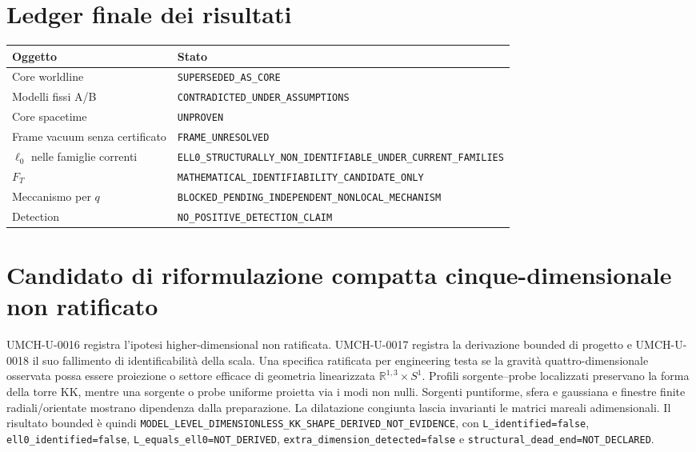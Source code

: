 \documentclass[11pt,a4paper]{article}
\begin{document}
\section{Ledger finale dei risultati}\label{sec:u-results}
\begin{center}\begin{tabular}{p{.48\linewidth}p{.43\linewidth}}\toprule
Oggetto&Stato\\\midrule
Core worldline&\verb|SUPERSEDED_AS_CORE|\\
Modelli fissi A/B&\verb|CONTRADICTED_UNDER_ASSUMPTIONS|\\
Core spacetime&\verb|UNPROVEN|\\
Frame vacuum senza certificato&\verb|FRAME_UNRESOLVED|\\
$\ell_0$ nelle famiglie correnti&\verb|ELL0_STRUCTURALLY_NON_IDENTIFIABLE_UNDER_CURRENT_FAMILIES|\\
$F_T$&\verb|MATHEMATICAL_IDENTIFIABILITY_CANDIDATE_ONLY|\\
Meccanismo per $q$&\verb|BLOCKED_PENDING_INDEPENDENT_NONLOCAL_MECHANISM|\\
Detection&\verb|NO_POSITIVE_DETECTION_CLAIM|\\\bottomrule\end{tabular}\end{center}

\section{Candidato di riformulazione compatta cinque-dimensionale non ratificato}\label{sec:u-kk-candidate}
UMCH-U-0016 registra l'ipotesi higher-dimensional non ratificata. UMCH-U-0017 registra la derivazione bounded di progetto e UMCH-U-0018 il suo fallimento di identificabilità della scala. Una specifica ratificata per engineering testa se la gravità quattro-dimensionale osservata possa essere proiezione o settore efficace di geometria linearizzata $\mathbb{R}^{1,3}\times S^1$. Profili sorgente--probe localizzati preservano la forma della torre KK, mentre una sorgente o probe uniforme proietta via i modi non nulli. Sorgenti puntiforme, sfera e gaussiana e finestre finite radiali/orientate mostrano dipendenza dalla preparazione. La dilatazione congiunta lascia invarianti le matrici mareali adimensionali. Il risultato bounded è quindi \verb|MODEL_LEVEL_DIMENSIONLESS_KK_SHAPE_DERIVED_NOT_EVIDENCE|, con \verb|L_identified=false|, \verb|ell0_identified=false|, \verb|L_equals_ell0=NOT_DERIVED|, \verb|extra_dimension_detected=false| e \verb|structural_dead_end=NOT_DECLARED|.
\end{document}
